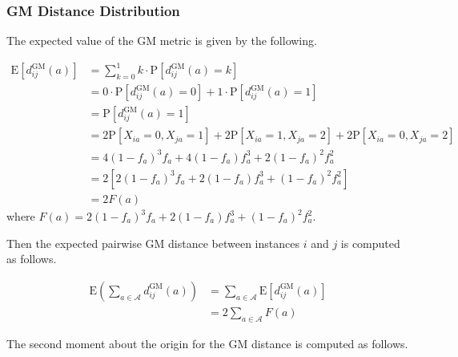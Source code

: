 \documentclass[10pt,letterpaper]{article}\usepackage[]{graphicx}\usepackage[]{color}
\begin{document}
\subsubsection{GM Distance Distribution}

The expected value of the GM metric is given by the following.

\begin{equation}\label{eq:mean_diff_GM}
\begin{aligned}
\text{E}\left[d^\text{GM}_{ij}(a)\right] &= \sum_{k=0}^{1} k \cdot \text{P}\left[d^\text{GM}_{ij}(a) = k\right] \\
&= 0 \cdot \text{P}\left[d^\text{GM}_{ij}(a) = 0\right] + 1 \cdot \text{P}\left[d^\text{GM}_{ij}(a) = 1\right] \\
&= \text{P}\left[d^\text{GM}_{ij}(a) = 1\right] \\
&= 2\text{P}[X_{ia} = 0, X_{ja} = 1] + 2\text{P}[X_{ia} = 1, X_{ja} = 2] + 2\text{P}[X_{ia} = 0, X_{ja} = 2] \\
&= 4(1 - f_a)^3f_a + 4(1 - f_a)f^3_a + 2(1 - f_a)^2f^2_a \\
&= 2\left[2(1 - f_a)^3f_a + 2(1 - f_a)f^3_a + (1 - f_a)^2f^2_a\right] \\
&= 2F(a)
\end{aligned}
\end{equation}
where $F(a) = 2(1 - f_a)^3f_a + 2(1 - f_a)f^3_a + (1 - f_a)^2f^2_a$.

Then the expected pairwise GM distance between instances $i$ and $j$ is computed as follows.

\begin{equation}\label{eq:mu_DDistr_GM}
\begin{aligned}
\text{E}\left(\sum_{a \in \mathcal{A}} d^\text{GM}_{ij}(a)\right) &= \sum_{a \in \mathcal{A}} \text{E}\left[d^\text{GM}_{ij}(a)\right] \\
&= 2 \sum_{a \in \mathcal{A}} F(a)
\end{aligned}
\end{equation}

The second moment about the origin for the GM distance is computed as follows.
\end{document}
